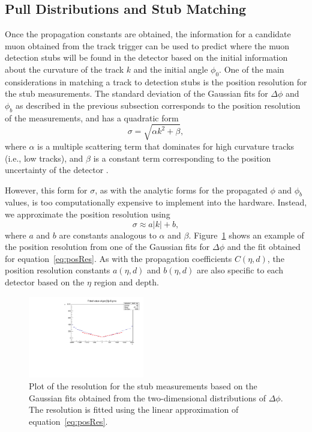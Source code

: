 \subsection{Pull Distributions and Stub Matching}
\label{subsec:pulls}

Once the propagation constants are obtained, the information for a candidate muon obtained from the track trigger can be used to predict where the muon detection stubs will be found in the detector based on the initial information about the curvature of the track $k$ and the initial angle $\phi_0$.
One of the main considerations in matching a track to detection stubs is the position resolution for the stub measurements.
The standard deviation of the Gaussian fits for $\Delta\phi$ and $\phi_b$ as described in the previous subsection corresponds to the position resolution of the measurements, and has a quadratic form
\begin{equation}
  \sigma=\sqrt{\alpha k^2+\beta},
\end{equation}
where $\alpha$ is a multiple scattering term that dominates for high curvature tracks (i.e., low \pt tracks), and $\beta$ is a constant term corresponding to the position uncertainty of the detector \cite{PhysRevD.98.030001}.

However, this form for $\sigma$, as with the analytic forms for the propagated $\phi$ and $\phi_b$ values, is too computationally expensive to implement into the hardware.
Instead, we approximate the position resolution using
\begin{equation}\label{eq:posRes}
  \sigma\approx a|k|+b,
\end{equation}
where $a$ and $b$ are constants analogous to $\alpha$ and $\beta$.
Figure~\ref{fig:deltaPhiRes} shows an example of the position resolution from one of the Gaussian fits for $\Delta\phi$ and the fit obtained for equation~\ref{eq:posRes}.
As with the propagation coefficients $C(\eta,d)$, the position resolution constants $a(\eta,d)$ and $b(\eta,d)$ are also specific to each detector based on the $\eta$ region and depth.

\begin{figure}[htbp] %
  \centering
  \includegraphics[width=0.45\textwidth]{fig/TPS/deltaPhi_res.pdf}
  \caption{
    Plot of the resolution for the stub measurements based on the Gaussian fits obtained from the two-dimensional distributions of $\Delta\phi$.
    The resolution is fitted using the linear approximation of equation~\ref{eq:posRes}.
  }
  \label{fig:deltaPhiRes}
\end{figure}

